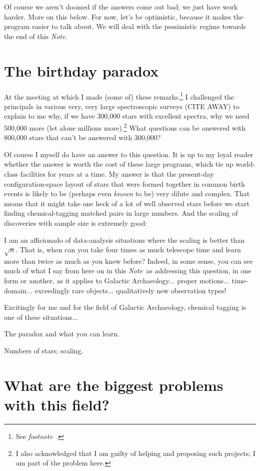 \documentclass[11pt, letterpaper]{article}
\newcommand{\documentname}{\textsl{Note}}
\newcommand{\footnotename}[1]{\textsl{footnote}~\footnotemark[\ref{#1}]}
\begin{document}
Of course we aren't doomed if the answers come out bad; we just have
work harder. More on this below. For now, let's be optimistic, because
it makes the program easier to talk about. We will deal with the
pessimistic regime towards the end of this \documentname.

\section{The birthday paradox}

At the meeting at which I made (some of) these remarks,\footnote{See
  \footnotename{foot:conference}.} I challenged the principals in
various very, very large spectroscopic surveys (CITE AWAY) to explain
to me why, if we have 300,000 stars with excellent spectra, why we
need 500,000 more (let alone millions more).\footnote{I also
  acknowledged that I am guilty of helping and proposing such
  projects; I am part of the problem here.} What questions can be
answered with 800,000 stars that can't be answered with 300,000? 

Of course I myself do have an answer to this question. It is up to my
loyal reader whether the answer is worth the cost of these large
programs, which tie up world-class facilities for years at a time.  My
answer is that the present-day configuration-space layout of stars
that were formed together in common birth events is likely to be
(perhaps even \emph{known} to be) very dilute and complex. That means
that it might take one heck of a lot of well observed stars before we
start finding chemical-tagging matched pairs in large numbers. And the
scaling of discoveries with sample size is extremely good:

I am an afficionado of data-analysis situations where the scaling is
better than $\sqrt{n}$. That is, when can you take four times as much
telescope time and learn more than twice as much as you knew before?
Indeed, in some sense, you can see much of what I say from here on in
this \documentname\ as addressing this question, in one form or
another, as it applies to Galactic Archaeology... proper
motions... time-domain... exceedingly rare objects... qualitatively
new observation types!

Excitingly for me and for the field of Galactic Archaeology, chemical
tagging is one of these situations...

The paradox and what you can learn.

Numbers of stars; scaling.

\section{What are the biggest problems with this field?}
\end{document}
